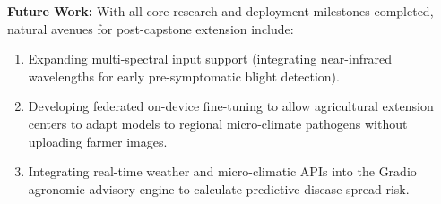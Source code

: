 \textbf{Future Work:}
With all core research and deployment milestones completed, natural avenues for post-capstone
extension include:
\begin{enumerate}[leftmargin=1.4em,itemsep=2pt]
\item Expanding multi-spectral input support (integrating near-infrared wavelengths for early pre-symptomatic blight detection).
\item Developing federated on-device fine-tuning to allow agricultural extension centers to adapt models to regional micro-climate pathogens without uploading farmer images.
\item Integrating real-time weather and micro-climatic APIs into the Gradio agronomic advisory engine to calculate predictive disease spread risk.
\end{enumerate}
